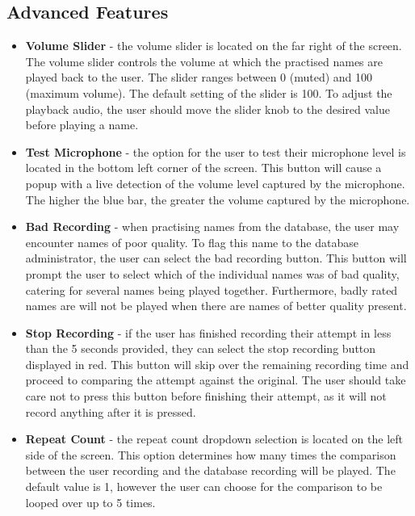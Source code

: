 \documentclass{article}
\begin{document}
\subsection{Advanced Features}

\begin{itemize}
	\item \textbf{Volume Slider} - the volume slider is located on the far right of the screen. The volume slider controls the volume at which
the practised names are played back to the user. The slider ranges between 0 (muted) and 100 (maximum volume). The default setting
of the slider is 100. To adjust the playback audio, the user should move the slider knob to the desired value before playing
a name.

	\item \textbf{Test Microphone} - the option for the user to test their microphone level is located in the bottom left corner of the screen.
This button will cause a popup with a live detection of the volume level captured by the microphone. The higher the blue bar, the
greater the volume captured by the microphone.

	\item \textbf{Bad Recording} - when practising names from the database, the user may encounter names of poor quality. To flag this name to 
the database administrator, the user can select the bad recording button. This button will prompt the user to select which of the 
individual names was of bad quality, catering for several names being played together. Furthermore, badly rated names are will not 
be played when there are names of better quality present.

	\item \textbf{Stop Recording} - if the user has finished recording their attempt in less than the 5 seconds provided, they can select the
stop recording button displayed in red. This button will skip over the remaining recording time and proceed to comparing the 
attempt against the original. The user should take care not to press this button before finishing their attempt, as it will
not record anything after it is pressed.

	\item \textbf{Repeat Count} - the repeat count dropdown selection is located on the left side of the screen. This option determines 
how many times the comparison between the user recording and the database recording will be played. The default value is 1, 
however the user can choose for the comparison to be looped over up to 5 times.

\end{itemize}
\end{document}
